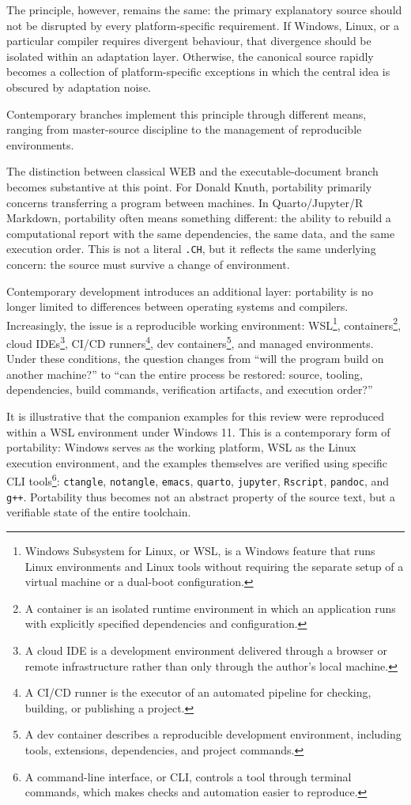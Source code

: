 \documentclass{ZGJournalArticle_2026}
\begin{document}
The principle, however, remains the same: the primary explanatory source
should not be disrupted by every platform-specific requirement. If
Windows, Linux, or a particular compiler requires divergent behaviour,
that divergence should be isolated within an adaptation layer.
Otherwise, the canonical source rapidly becomes a collection of
platform-specific exceptions in which the central idea is obscured by
adaptation noise.

Contemporary branches implement this principle through different means,
ranging from master-source discipline to the management of reproducible
environments.

The distinction between classical WEB and the executable-document branch
becomes substantive at this point. For Donald Knuth, portability
primarily concerns transferring a program between machines. In
Quarto/Jupyter/R Markdown, portability often means something different:
the ability to rebuild a computational report with the same
dependencies, the same data, and the same execution order. This is not a
literal \texttt{.CH}, but it reflects the same underlying concern: the
source must survive a change of environment.

Contemporary development introduces an additional layer: portability is
no longer limited to differences between operating systems and
compilers. Increasingly, the issue is a reproducible working
environment: WSL\footnote{Windows Subsystem for Linux, or WSL, is a
  Windows feature that runs Linux environments and Linux tools without
  requiring the separate setup of a virtual machine or a dual-boot
  configuration.}, containers\footnote{A container is an isolated
  runtime environment in which an application runs with explicitly
  specified dependencies and configuration.}, cloud IDEs\footnote{A
  cloud IDE is a development environment delivered through a browser or
  remote infrastructure rather than only through the author's local
  machine.}, CI/CD runners\footnote{A CI/CD runner is the executor of an
  automated pipeline for checking, building, or publishing a project.},
dev containers\footnote{A dev container describes a reproducible
  development environment, including tools, extensions, dependencies,
  and project commands.}, and managed environments. Under these
conditions, the question changes from ``will the program build on
another machine?'' to ``can the entire process be restored: source,
tooling, dependencies, build commands, verification artifacts, and
execution order?''

It is illustrative that the companion examples for this review were
reproduced within a WSL environment under Windows 11. This is a
contemporary form of portability: Windows serves as the working
platform, WSL as the Linux execution environment, and the examples
themselves are verified using specific CLI tools\footnote{A command-line
  interface, or CLI, controls a tool through terminal commands, which
  makes checks and automation easier to reproduce.}: \texttt{ctangle},
\texttt{notangle}, \texttt{emacs}, \texttt{quarto}, \texttt{jupyter},
\texttt{Rscript}, \texttt{pandoc}, and \texttt{g++}. Portability thus
becomes not an abstract property of the source text, but a verifiable
state of the entire toolchain.
\end{document}
